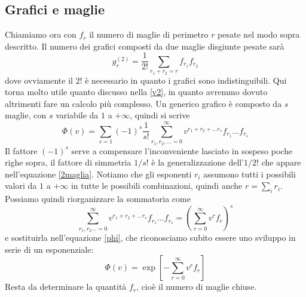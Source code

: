 \documentclass[11pt]{article}
\begin{document}
\subsection{Grafici e maglie}
Chiamiamo ora con $f_r$ il numero di maglie di perimetro $r$ pesate nel modo sopra descritto. Il numero dei grafici composti da due maglie disgiunte pesate sarà
\begin{equation}\label{2maglia}
g_r^{(2)}=\frac{1}{2!}\sum_{r_1+r_2=r}f_{r_1}f_{r_2}
\end{equation}
dove ovviamente il $2!$ è necessario in quanto i grafici sono indistinguibili. Qui torna molto utile quanto discusso nella \ref{v2}, in quanto avremmo dovuto altrimenti fare un calcolo più complesso. Un generico grafico è composto da $s$ maglie, con $s$ variabile da $1$ a $+\infty$, quindi si scrive
\begin{equation} \label{phi}
\Phi(v)=\sum_{s=1}(-1)^s\frac{1}{s!}\sum_{r_1,r_2,...=0}^\infty v^{r_1+r_2+...r_s}f_{r_1}...f_{r_s}
\end{equation}
Il fattore $(-1)^s$ serve a compensare l'inconveniente lasciato in sospeso poche righe sopra, il fattore di simmetria $1/s!$ è la generalizzazione dell'$1/2!$ che appare nell'equazione \ref{2maglia}. Notiamo che gli esponenti $r_i$ assumono tutti i possibili valori da $1$ a $+\infty$ in tutte le possibili combinazioni, quindi anche $r=\sum_i r_i$. Possiamo quindi riorganizzare la sommatoria come
$$\sum_{r_1,r_2...=0}^\infty v^{r_1+r_2+...r_s}f_{r_1}...f_{r_s}=\left( \sum_{r=0}^\infty v^rf_r \right)^s$$
e sostituirla nell'equazione \ref{phi}, che riconosciamo subito essere uno sviluppo in serie di un esponenziale:
\begin{equation}\label{phi2}
 \Phi(v)= \exp \left[ - \sum_{r=0}^\infty v^r f_r \right]
\end{equation}
Resta da determinare la quantità $f_r$, cioè il numero di maglie chiuse.
\end{document}
